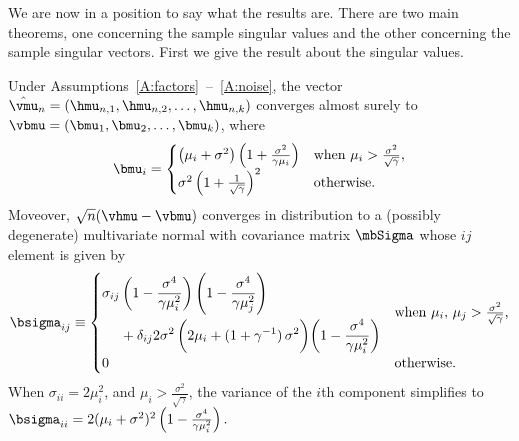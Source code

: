 We are now in a position to say what the results are.  There are two main
theorems, one concerning the sample singular values and the other concerning
the sample singular vectors.  First we give the result about the singular
values.
\begin{theorem}\label{T:spiked-eigenvalue-limits}
    Under Assumptions~\ref{A:factors}~--~\ref{A:noise},
    the vector $\hat \vmu_n = (\hmu_{n,1}, \hmu_{n,2}, \ldots, \hmu_{n,k})$
    converges almost surely to 
    $\vbmu = (\bmu_1, \bmu_2, \ldots, \bmu_k)$,
    where
    \begin{equation}
        \bmu_i
        =
        \begin{cases}
            \left( \mu_i + \sigma^2 \right)
            \left( 1 + \frac{\sigma^2}{\gamma \mu_i} \right)
                &\text{when $\mu_i > \frac{\sigma^2}{\sqrt{\gamma}}$}, \\
            \sigma^2 \left( 1 + \frac{1}{\sqrt{\gamma}} \right)^2
                &\text{otherwise.}
        \end{cases}
    \end{equation}
    Moveover, 
    \(
        \sqrt{n} (\vhmu - \vbmu)
    \)
    converges in distribution to a (possibly degenerate) multivariate normal
    with covariance matrix $\mbSigma$ whose $ij$ element is given by
    \begin{equation}
        \bsigma_{ij}
        \equiv
        \begin{cases}
            \begin{aligned}
                \sigma_{ij}
                &\left(
                    1 - \frac{\sigma^4}{\gamma \mu_i^2}
                \right)
                \left(
                    1 - \frac{\sigma^4}{\gamma \mu_j^2}
                \right)
                \\
                &+ \delta_{ij}
                2
                \sigma^2 \,
                \bigg(
                    2 \mu_i + (1 + \gamma^{-1}) \, \sigma^2
                \bigg)
                \bigg(
                    1 - \frac{ \sigma^4 }{ \gamma  \mu_i^2 }
                \bigg)
            \end{aligned}
                &\text{when $\mu_i, \, \mu_j >
                           \frac{\sigma^2}{\sqrt{\gamma}}$,} \\
            0
                &\text{otherwise.}
        \end{cases}
    \end{equation}
    When $\sigma_{ii} = 2 \mu_i^2$, 
    and $\mu_i > \frac{\sigma^2}{\sqrt{\gamma}}$, the variance of the $i$th
    component simplifies to
    \(
        \bsigma_{ii} 
        = 
        2 (\mu_i + \sigma^2)^2 
        \left( 1 - \frac{\sigma^4}{\gamma \mu_i^2} \right).
    \)
\end{theorem}

